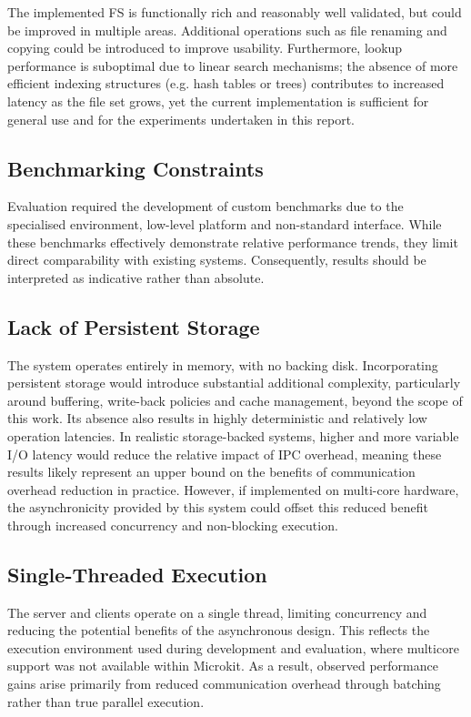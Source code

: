 The implemented FS is functionally rich and reasonably well validated, but could be improved in multiple areas. Additional operations such as file renaming and copying could be introduced to improve usability. Furthermore, lookup performance is suboptimal due to linear search mechanisms; the absence of more efficient indexing structures (e.g. hash tables or trees) contributes to increased latency as the file set grows, yet the current implementation is sufficient for general use and for the experiments undertaken in this report.

\subsection{Benchmarking Constraints}

Evaluation required the development of custom benchmarks due to the specialised environment, low-level platform and non-standard interface. While these benchmarks effectively demonstrate relative performance trends, they limit direct comparability with existing systems. Consequently, results should be interpreted as indicative rather than absolute.

\subsection{Lack of Persistent Storage}

The system operates entirely in memory, with no backing disk. Incorporating persistent storage would introduce substantial additional complexity, particularly around buffering, write-back policies and cache management, beyond the scope of this work. Its absence also results in highly deterministic and relatively low operation latencies. In realistic storage-backed systems, higher and more variable I/O latency would reduce the relative impact of IPC overhead, meaning these results likely represent an upper bound on the benefits of communication overhead reduction in practice. However, if implemented on multi-core hardware, the asynchronicity provided by this system could offset this reduced benefit through increased concurrency and non-blocking execution.

\subsection{Single-Threaded Execution}

The server and clients operate on a single thread, limiting concurrency and reducing the potential benefits of the asynchronous design. This reflects the execution environment used during development and evaluation, where multicore support was not available within Microkit. As a result, observed performance gains arise primarily from reduced communication overhead through batching rather than true parallel execution.

